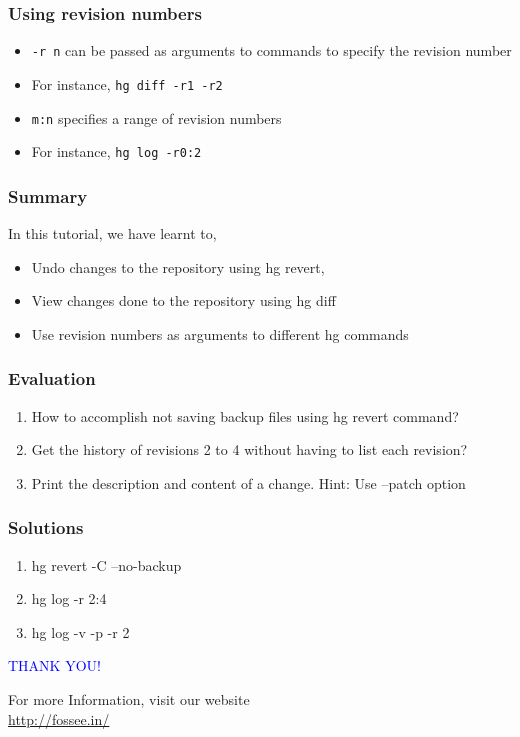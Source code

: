 \documentclass[12pt,compress]{beamer}
\newcommand{\typ}[1]{\lstinline{#1}}
\begin{document}
\begin{frame}[fragile]
  \frametitle{Using revision numbers}
  \begin{itemize}
  \item \typ{-r n} can be passed as arguments to commands to specify
    the revision number
  \item For instance, \typ{hg diff -r1 -r2}
  \item \typ{m:n} specifies a range of revision numbers
  \item For instance, \typ{hg log -r0:2}
  \end{itemize}
\end{frame}


\begin{frame}
\frametitle{Summary}
In this tutorial, we have learnt to,

\begin{itemize}
\item Undo changes to the repository using hg revert,
\item View changes done to the repository using hg diff
\item Use revision numbers as arguments to different hg commands
\end{itemize}
\end{frame}

\begin{frame}[fragile]
\frametitle{Evaluation}

\begin{enumerate}
\item How to accomplish not saving backup files using hg revert command?
\item Get the history of revisions 2 to 4 without having to list each revision? 
\item Print the description and content of a change. Hint: Use --patch option
\end{enumerate}
\end{frame}

\begin{frame}
\frametitle{Solutions}
\begin{enumerate}
\item hg revert -C --no-backup
\item hg log -r 2:4
\item hg log -v -p -r 2
\end{enumerate}
\end{frame}

\begin{frame}
\begin{block}{}
  \begin{center}
  \textcolor{blue}{\Large THANK YOU!} 
  \end{center}
  \end{block}
\begin{block}{}
  \begin{center}
    For more Information, visit our website\\
    \url{http://fossee.in/}
  \end{center}  
  \end{block}
\end{frame}
\end{document}

